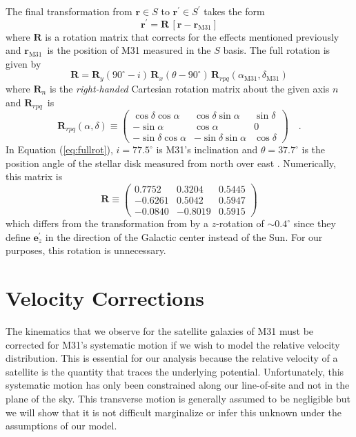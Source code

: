 \documentclass[preprint]{aastex}
\newcommand{\eqlabel}[1]{\label{eq:#1}}
\newcommand{\eq}[1]{Equation (\ref{eq:#1})}
\newcommand{\bvec}[1]{\ensuremath{\boldsymbol{#1}}}
\renewcommand{\vector}[1]{\ensuremath{\bvec{#1}}}
\renewcommand{\matrix}[1]{\ensuremath{\bvec{#1}}}
\newcommand{\posand}{\ensuremath{\vector{r}_\mathrm{M31}}}
\newcommand{\R}{\ensuremath{\matrix{R}}}
\newcommand{\Rx}{\ensuremath{\R_x}}
\newcommand{\Ry}{\ensuremath{\R_y}}
\newcommand{\Rrpq}{\ensuremath{\R_{rpq}}}
\begin{document}
The final transformation from $\vector{r} \in S$ to
$\vector{r}^\prime \in S^\prime$ takes the form
\begin{equation}
    \vector{r}^\prime = \R \, [\vector{r} - \posand]
\end{equation}
where $\matrix{R}$ is a rotation matrix that corrects for the effects
mentioned previously and \posand\ is the position of M31 measured in the
$S$ basis. The full rotation is given by
\begin{equation}
    \eqlabel{fullrot}
    \matrix{R} = \Ry (90^\circ - i) \, \Rx (\theta - 90^\circ)
        \, \Rrpq (\alpha_\mathrm{M31}, \delta_\mathrm{M31})
\end{equation}
where $\R_n$ is the \emph{right-handed} Cartesian rotation matrix about the
given axis $n$ and \Rrpq\ is
\begin{equation}
    \eqlabel{triad}
    \Rrpq (\alpha, \delta) \equiv \left ( \begin{array}{ccc}
    \cos \delta \cos \alpha & \cos \delta \sin \alpha & \sin \delta \\
    -\sin \alpha & \cos \alpha & 0 \\
    -\sin \delta \cos \alpha & -\sin \delta \sin \alpha & \cos \delta
    \end{array} \right ) \quad .
\end{equation}
In \eq{fullrot}, $i = 77.5^\circ$ is M31's inclination and
$\theta = 37.7^\circ$ is the position angle of the stellar disk measured
from north over east \citep{de-Vaucouleurs:1958}.  Numerically, this matrix
is
\begin{equation}
    \eqlabel{fullrotation}
    \R \equiv \left ( \begin{array}{ccc}
0.7752 & 0.3204 & 0.5445 \\
-0.6261 & 0.5042 & 0.5947 \\
-0.0840 & -0.8019 & 0.5915
\end{array} \right )
\end{equation}
which differs from the transformation from \citet{Metz:2007} by a
$z$-rotation of $\sim 0.4^\circ$ since they define $\mathbf{e}_z^\prime$
in the direction of the Galactic center instead of the Sun. For our
purposes, this rotation is unnecessary.

\section{Velocity Corrections}

The kinematics that we observe for the satellite galaxies of M31 must be
corrected for M31's systematic motion if we wish to model the relative
velocity distribution. This is essential for our analysis because the
relative velocity of a satellite is the quantity that traces the underlying
potential. Unfortunately, this systematic motion has only been constrained
along our line-of-site and not in the plane of the sky. This transverse
motion is generally assumed to be negligible but we will show that it is
not difficult marginalize or infer this unknown under the assumptions of
our model.
\end{document}
